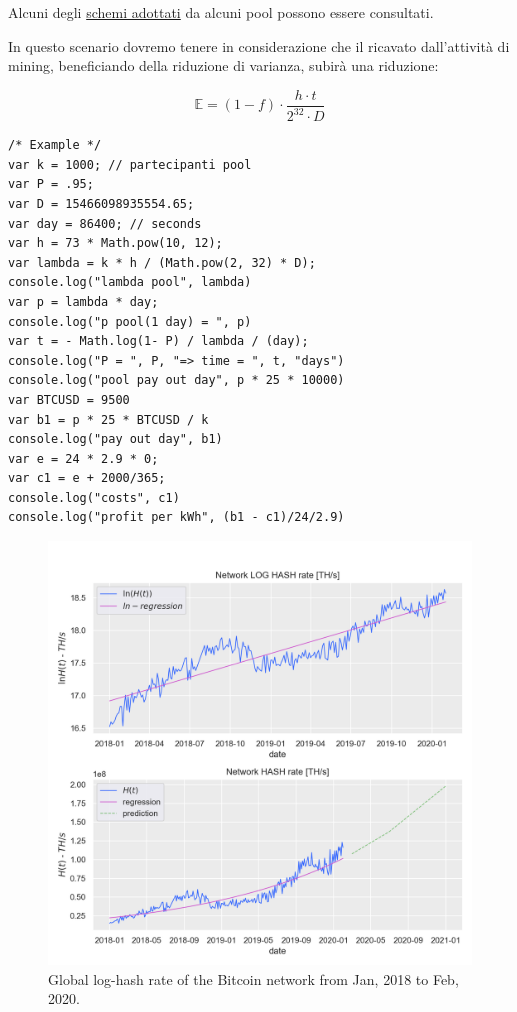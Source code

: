 \documentclass{article}
\begin{document}
Alcuni degli \href{https://en.bitcoin.it/wiki/Comparison_of_mining_pools}{schemi adottati} da alcuni pool possono essere consultati.

In questo scenario dovremo tenere in considerazione che il ricavato dall'attività di mining, beneficiando della riduzione di varianza,
subirà una riduzione:

\begin{equation}
    \mathbb{E} = (1 - f) \cdot \frac{h \cdot t}{2^{32} \cdot D} \label{adjusted_lambda}
\end{equation}




\lstset{style=mystyle}
\begin{lstlisting}[language=VBScript]
/* Example */
var k = 1000; // partecipanti pool
var P = .95;
var D = 15466098935554.65;
var day = 86400; // seconds
var h = 73 * Math.pow(10, 12);
var lambda = k * h / (Math.pow(2, 32) * D);
console.log("lambda pool", lambda)
var p = lambda * day;
console.log("p pool(1 day) = ", p)
var t = - Math.log(1- P) / lambda / (day);
console.log("P = ", P, "=> time = ", t, "days")
console.log("pool pay out day", p * 25 * 10000)
var BTCUSD = 9500
var b1 = p * 25 * BTCUSD / k
console.log("pay out day", b1)
var e = 24 * 2.9 * 0;
var c1 = e + 2000/365;
console.log("costs", c1)
console.log("profit per kWh", (b1 - c1)/24/2.9)
\end{lstlisting}

\begin{figure}[!htb]
    \centering
    \includegraphics[width=1.0\textwidth]{img/bitcoin-hash-rate.png}
    \caption{Global log-hash rate of the Bitcoin network from Jan, 2018 to Feb, 2020.}
    \label{fig:hash_power}
\end{figure}
\end{document}
